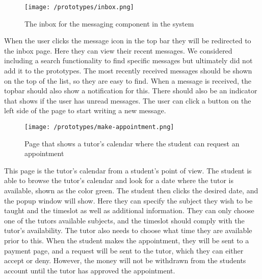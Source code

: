  \begin{figure}[H]
    \texttt{[image: /prototypes/inbox.png]}
     \caption{The inbox for the messaging component in the system}
     \label{fig:inbox}
 \end{figure}
When the user clicks the message icon in the top bar they will be redirected to the inbox page. Here they can view their recent messages. 
We considered including a search functionality to find specific messages but ultimately did not add it to the prototypes. 
The most recently received messages should be shown on the top of the list, so they are easy to find. 
When a message is received, the topbar should also show a notification for this. 
There should also be an indicator that shows if the user has unread messages. 
The user can click a button on the left side of the page to start writing a new message. 


 \begin{figure}[H]
    \texttt{[image: /prototypes/make-appointment.png]}
     \caption{Page that shows a tutor's calendar where the student can request an appointment}
     \label{fig:make-appointment}
 \end{figure}
 This page is the tutor's calendar from a student's point of view. 
 The student is able to browse the tutor's calendar and look for a date where the tutor is available, shown as the color green. 
 The student then clicks the desired date, and the popup window will show. 
 Here they can specify the subject they wish to be taught and the timeslot as well as additional information. 
 They can only choose one of the tutors available subjects, and the timeslot should comply with the tutor's availability. 
 The tutor also needs to choose what time they are available prior to this.
 When the student makes the appointment, they will be sent to a payment page, and a request will be sent to the tutor, which they can either accept or deny.
 However, the money will not be withdrawn from the students account until the tutor has approved the appointment.

